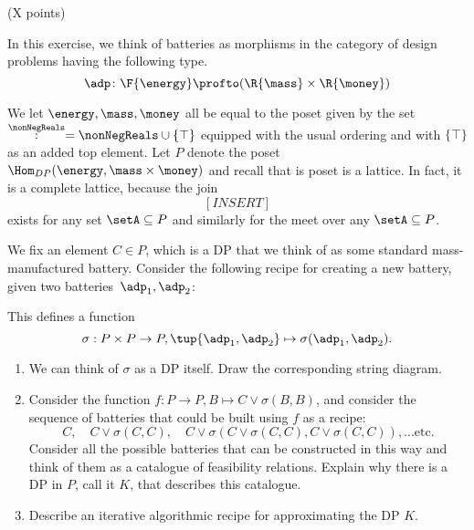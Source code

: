 \documentclass[paper=8.125in:10.250in,pagesize=pdftex,
    headinclude=false,footinclude=false,oneside,egregdoesnotlikesansseriftitles]{kaobook}
\begin{document}

\newpage


\begin{gradedexercise}\label{ex:BatteryDP} (X points)

In this exercise, we think of batteries as morphisms in the category of design problems having the following type.
    \begin{equation}
        \adp \colon \F{\energy}\profto (\R{\mass}\times \R{\money})
    \end{equation}
    \begin{center}
    \end{center}
We let $\energy,\mass,\money$ all be equal to the poset given by the set $\overset{\nonNegReals} := \nonNegReals \cup \{\top\}$ equipped with the usual ordering and with $\{ \top \}$ as an added top element. Let $P$ denote the poset $\Hom_{DP}(\energy, \mass \times \money)$ and recall that is poset is a lattice. In fact, it is a complete lattice, because the join
$$
[INSERT]
$$
exists for any set $\setA \subseteq P$ and similarly for the meet over any $\setA \subseteq P$. 

We fix an element $C \in P$, which is a DP that we think of as some standard mass-manufactured battery. Consider the following recipe for creating a new battery, given two batteries~$\adp_1,\adp_2$:
    \begin{center}
    \end{center}
This defines a function 
$$
\sigma: P \times P \to P, \tup{\adp_1,\adp_2} \mapsto \sigma(\adp_1,\adp_2).
$$

\begin{enumerate}
\item We can think of $\sigma$ as a DP itself. Draw the corresponding string diagram. 
\item Consider the function $f: P \to P, B \mapsto C \vee \sigma(B,B)$, and consider the sequence of batteries that could be built using $f$ as a recipe: 
$$
C, \quad C \vee \sigma(C,C), \quad C \vee \sigma(C \vee \sigma(C,C), C \vee \sigma(C,C)), ... \text{etc.}
$$
Consider all the possible batteries that can be constructed in this way and think of them as a catalogue of feasibility relations. 
Explain why there is a DP in $P$, call it $K$, that describes this catalogue.
\item Describe an iterative algorithmic recipe for approximating the DP $K$. 
\end{enumerate}

\end{gradedexercise}
\end{document}

